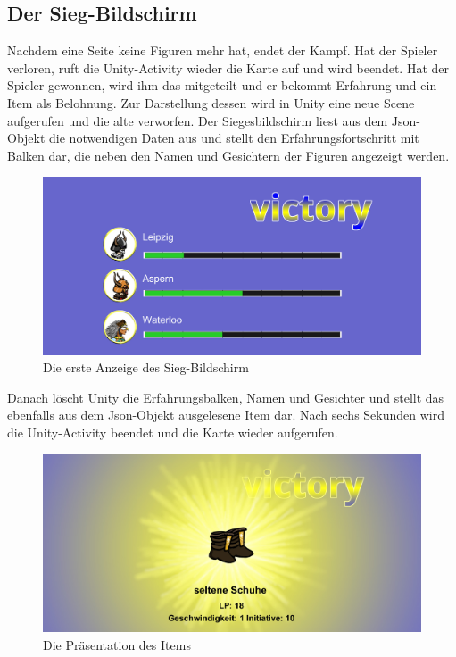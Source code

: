 \documentclass[extern,palatino]{cgBA}
\begin{document}
\subsection{Der Sieg-Bildschirm}
Nachdem eine Seite keine Figuren mehr hat, endet der Kampf. Hat der Spieler verloren, ruft die Unity-Activity wieder die Karte auf und wird beendet. Hat der Spieler gewonnen, wird ihm das mitgeteilt und er bekommt Erfahrung und ein Item als Belohnung. Zur Darstellung dessen wird in Unity eine neue Scene aufgerufen und die alte verworfen. Der Siegesbildschirm liest aus dem Json-Objekt die notwendigen Daten aus und stellt den Erfahrungsfortschritt mit Balken dar, die neben den Namen und Gesichtern der Figuren angezeigt werden. 
\begin{figure}[H]
	\centering
	\includegraphics[width=1\textwidth]{sieg1}
	\caption{Die erste Anzeige des Sieg-Bildschirm}
\end{figure}
Danach löscht Unity die Erfahrungsbalken, Namen und Gesichter und stellt das ebenfalls aus dem Json-Objekt ausgelesene Item dar. Nach sechs Sekunden wird die Unity-Activity beendet und die Karte wieder aufgerufen.
\begin{figure}[H]
	\centering
	\includegraphics[width=1\textwidth]{sieg2}
	\caption{Die Präsentation des Items}
\end{figure}
\newpage
\end{document}
